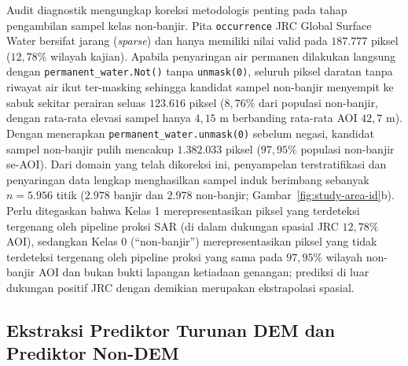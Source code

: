 \documentclass[11pt,twoside]{article}
\begin{document}
Audit diagnostik mengungkap koreksi metodologis penting pada tahap pengambilan sampel kelas non-banjir. Pita \texttt{occurrence} JRC Global Surface Water bersifat jarang (\textit{sparse}) dan hanya memiliki nilai valid pada $187.777$ piksel ($12{,}78\%$ wilayah kajian). Apabila penyaringan air permanen dilakukan langsung dengan \texttt{permanent\_water.Not()} tanpa \texttt{unmask(0)}, seluruh piksel daratan tanpa riwayat air ikut ter-masking sehingga kandidat sampel non-banjir menyempit ke sabuk sekitar perairan seluas $123.616$ piksel ($8{,}76\%$ dari populasi non-banjir, dengan rata-rata elevasi sampel hanya $4{,}15\text{ m}$ berbanding rata-rata AOI $42{,}7\text{ m}$). Dengan menerapkan \texttt{permanent\_water.unmask(0)} sebelum negasi, kandidat sampel non-banjir pulih mencakup $1.382.033$ piksel ($97{,}95\%$ populasi non-banjir se-AOI). Dari domain yang telah dikoreksi ini, penyampelan terstratifikasi dan penyaringan data lengkap menghasilkan sampel induk berimbang sebanyak $n = 5.956$ titik ($2.978$ banjir dan $2.978$ non-banjir; Gambar~\ref{fig:study-area-id}b). Perlu ditegaskan bahwa Kelas 1 merepresentasikan piksel yang terdeteksi tergenang oleh pipeline proksi SAR (di dalam dukungan spasial JRC $12{,}78\%$ AOI), sedangkan Kelas 0 (``non-banjir'') merepresentasikan piksel yang tidak terdeteksi tergenang oleh pipeline proksi yang sama pada $97{,}95\%$ wilayah non-banjir AOI dan bukan bukti lapangan ketiadaan genangan; prediksi di luar dukungan positif JRC dengan demikian merupakan ekstrapolasi spasial.

\subsection{Ekstraksi Prediktor Turunan DEM dan Prediktor Non-DEM}\label{subsec:prediktor-id}
\end{document}
